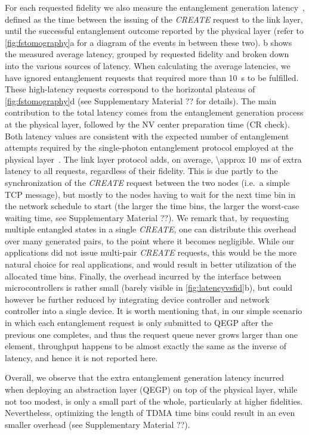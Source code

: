 For each requested fidelity we also measure the entanglement generation
latency~\cite{dahlberg_2019_egp}, defined as the time between the issuing of the \emph{CREATE}
request to the link layer, until the successful entanglement outcome reported by the physical layer
(refer to \cref{fig:fstomography}a for a diagram of the events in between these two).
b shows the measured average latency, grouped by requested fidelity and
broken down into the various sources of latency. When calculating the average latencies, we have
ignored entanglement requests that required more than \qty{10}{s} to be fulfilled. These
high-latency requests correspond to the horizontal plateaus of \cref{fig:fstomography}d (see
Supplementary Material ?? for details). The main contribution to the total latency comes from the
entanglement generation process at the physical layer, followed by the NV center preparation time
(CR check). Both latency values are consistent with the expected number of entanglement attempts
required by the single-photon entanglement protocol employed at the physical
layer~\cite{humphreys_2018_delivery}. The link layer protocol adds, on average, \qty{\approx
10}{\ms} of extra latency to all requests, regardless of their fidelity. This is due partly to the
synchronization of the \emph{CREATE} request between the two nodes (i.e.~a simple TCP message), but
mostly to the nodes having to wait for the next time bin in the network schedule to start (the
larger the time bins, the larger the worst-case waiting time, see Supplementary Material ??). We
remark that, by requesting multiple entangled states in a single \emph{CREATE}, one can distribute
this overhead over many generated pairs, to the point where it becomes negligible. While our
applications did not issue multi-pair \emph{CREATE} requests, this would be the more natural choice
for real applications, and would result in better utilization of the allocated time bins. Finally,
the overhead incurred by the interface between microcontrollers is rather small (barely visible in
\cref{fig:latencyvsfid}b), but could however be further reduced by integrating device controller and
network controller into a single device. It is worth mentioning that, in our simple scenario in
which each entanglement request is only submitted to QEGP after the previous one completes, and thus
the request queue never grows larger than one element, throughput happens to be almost exactly the
same as the inverse of latency, and hence it is not reported here.

Overall, we observe that the extra entanglement generation latency incurred when deploying an
abstraction layer (QEGP) on top of the physical layer, while not too modest, is only a small part of
the whole, particularly at higher fidelities. Nevertheless, optimizing the length of TDMA time bins
could result in an even smaller overhead (see Supplementary Material ??).

